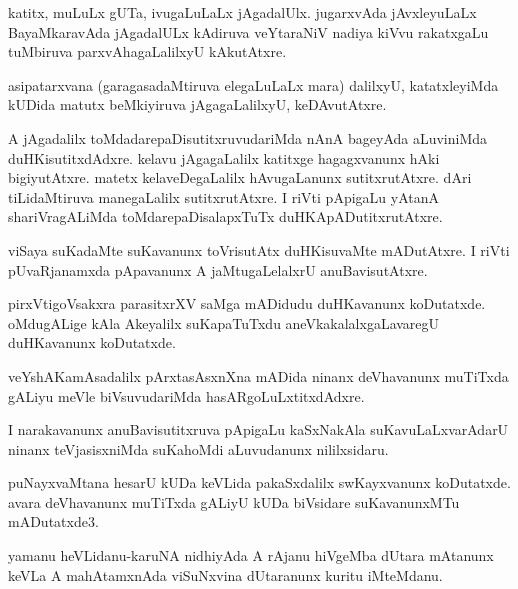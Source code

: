 \documentclass{article}
\begin{document}
\begin{mn}%
katitx, muLuLx gUTa, ivugaLuLaLx jAgadalUlx. jugarxvAda jAvxleyuLaLx BayaMkaravAda 
jAgadalULx kAdiruva  veYtaraNiV nadiya kiVvu rakatxgaLu tuMbiruva parxvAhagaLalilxyU 
kAkutAtxre.
\end{mn}

\begin{mn}%
asipatarxvana (garagasadaMtiruva elegaLuLaLx mara) dalilxyU, katatxleyiMda kUDida matutx 
beMkiyiruva jAgagaLalilxyU, keDAvutAtxre.
\end{mn}

\begin{mn}%
A jAgadalilx toMdadarepaDisutitxruvudariMda nAnA bageyAda aLuviniMda duHKisutitxdAdxre. 
kelavu jAgagaLalilx katitxge hagagxvanunx hAki bigiyutAtxre. matetx kelaveDegaLalilx 
hAvugaLanunx sutitxrutAtxre. dAri tiLidaMtiruva manegaLalilx sutitxrutAtxre. I riVti 
pApigaLu yAtanA shariVragALiMda toMdarepaDisalapxTuTx duHKApADutitxrutAtxre.
\end{mn}

\begin{mn}%
viSaya suKadaMte suKavanunx toVrisutAtx duHKisuvaMte mADutAtxre. I riVti pUvaRjanamxda 
pApavanunx A jaMtugaLelalxrU anuBavisutAtxre.
\end{mn}

\begin{mn}%
pirxVtigoVsakxra parasitxrXV saMga mADidudu duHKavanunx koDutatxde. oMdugALige kAla 
Akeyalilx suKapaTuTxdu aneVkakalalxgaLavaregU duHKavanunx koDutatxde.
\end{mn}

\begin{mn}%
veYshAKamAsadalilx pArxtasAsxnXna mADida ninanx deVhavanunx muTiTxda gALiyu meVle 
biVsuvudariMda hasARgoLuLxtitxdAdxre.
\end{mn}

\begin{mn}%
I narakavanunx anuBavisutitxruva pApigaLu kaSxNakAla suKavuLaLxvarAdarU ninanx 
teVjasisxniMda suKahoMdi aLuvudanunx nililxsidaru.
\end{mn}

\begin{mn}%
puNayxvaMtana hesarU kUDa keVLida pakaSxdalilx swKayxvanunx koDutatxde. avara deVhavanunx 
muTiTxda gALiyU kUDa biVsidare suKavanunxMTu mADutatxde3.
\end{mn}

\begin{mn}%
yamanu heVLidanu-karuNA nidhiyAda A rAjanu  hiVgeMba dUtara mAtanunx keVLa A mahAtamxnAda 
viSuNxvina dUtaranunx kuritu iMteMdanu.
\end{mn}
\end{document}
